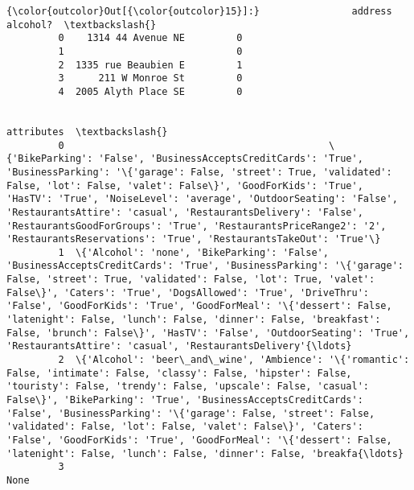 \documentclass[11pt]{article}
\begin{document}
\begin{Verbatim}[commandchars=\\\{\}]
{\color{outcolor}Out[{\color{outcolor}15}]:}                address  alcohol?  \textbackslash{}
         0    1314 44 Avenue NE         0   
         1                              0   
         2  1335 rue Beaubien E         1   
         3      211 W Monroe St         0   
         4  2005 Alyth Place SE         0   
         
                                                                                                                                                                                                                                                                                                                                                                                                                                                                                                                     attributes  \textbackslash{}
         0                                              \{'BikeParking': 'False', 'BusinessAcceptsCreditCards': 'True', 'BusinessParking': '\{'garage': False, 'street': True, 'validated': False, 'lot': False, 'valet': False\}', 'GoodForKids': 'True', 'HasTV': 'True', 'NoiseLevel': 'average', 'OutdoorSeating': 'False', 'RestaurantsAttire': 'casual', 'RestaurantsDelivery': 'False', 'RestaurantsGoodForGroups': 'True', 'RestaurantsPriceRange2': '2', 'RestaurantsReservations': 'True', 'RestaurantsTakeOut': 'True'\}   
         1  \{'Alcohol': 'none', 'BikeParking': 'False', 'BusinessAcceptsCreditCards': 'True', 'BusinessParking': '\{'garage': False, 'street': True, 'validated': False, 'lot': True, 'valet': False\}', 'Caters': 'True', 'DogsAllowed': 'True', 'DriveThru': 'False', 'GoodForKids': 'True', 'GoodForMeal': '\{'dessert': False, 'latenight': False, 'lunch': False, 'dinner': False, 'breakfast': False, 'brunch': False\}', 'HasTV': 'False', 'OutdoorSeating': 'True', 'RestaurantsAttire': 'casual', 'RestaurantsDelivery'{\ldots}   
         2  \{'Alcohol': 'beer\_and\_wine', 'Ambience': '\{'romantic': False, 'intimate': False, 'classy': False, 'hipster': False, 'touristy': False, 'trendy': False, 'upscale': False, 'casual': False\}', 'BikeParking': 'True', 'BusinessAcceptsCreditCards': 'False', 'BusinessParking': '\{'garage': False, 'street': False, 'validated': False, 'lot': False, 'valet': False\}', 'Caters': 'False', 'GoodForKids': 'True', 'GoodForMeal': '\{'dessert': False, 'latenight': False, 'lunch': False, 'dinner': False, 'breakfa{\ldots}   
         3                                                                                                                                                                                                                                                                                                                                                                                                                                                                                                                 None   

\end{Verbatim}
\end{document}
